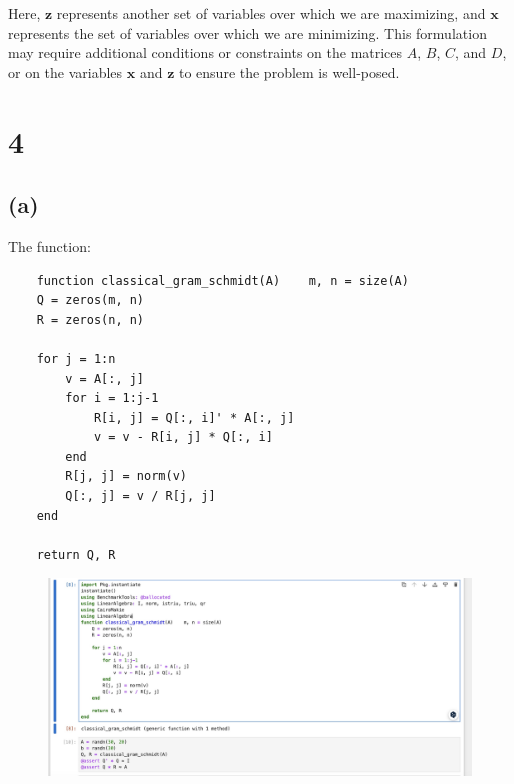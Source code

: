 \documentclass{article}
\begin{document}
Here, \( \boldsymbol{z} \) represents another set of variables over which we are maximizing, and \( \boldsymbol{x} \) represents the set of variables over which we are minimizing. This formulation may require additional conditions or constraints on the matrices \( A \), \( B \), \( C \), and \( D \), or on the variables \( \boldsymbol{x} \) and \( \boldsymbol{z} \) to ensure the problem is well-posed.
\section{4}
\subsection{(a)}
The function:
\begin{verbatim}
    function classical_gram_schmidt(A)    m, n = size(A)
    Q = zeros(m, n)
    R = zeros(n, n)
    
    for j = 1:n
        v = A[:, j]
        for i = 1:j-1
            R[i, j] = Q[:, i]' * A[:, j]
            v = v - R[i, j] * Q[:, i]
        end
        R[j, j] = norm(v)
        Q[:, j] = v / R[j, j]
    end
    
    return Q, R
\end{verbatim}

\begin{figure}[H]
    \centering
    \includegraphics[width=0.75\linewidth]{Image 3-4-24 at 01.22.jpeg}  
\end{figure}
\end{document}
